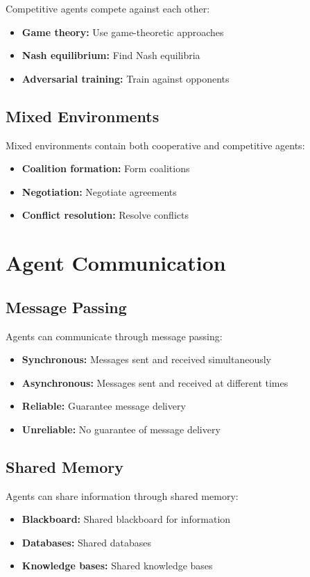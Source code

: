 Competitive agents compete against each other:
\begin{itemize}
    \item \textbf{Game theory:} Use game-theoretic approaches
    \item \textbf{Nash equilibrium:} Find Nash equilibria
    \item \textbf{Adversarial training:} Train against opponents
\end{itemize}

\subsection{Mixed Environments}

Mixed environments contain both cooperative and competitive agents:
\begin{itemize}
    \item \textbf{Coalition formation:} Form coalitions
    \item \textbf{Negotiation:} Negotiate agreements
    \item \textbf{Conflict resolution:} Resolve conflicts
\end{itemize}

\section{Agent Communication}

\subsection{Message Passing}

Agents can communicate through message passing:
\begin{itemize}
    \item \textbf{Synchronous:} Messages sent and received simultaneously
    \item \textbf{Asynchronous:} Messages sent and received at different times
    \item \textbf{Reliable:} Guarantee message delivery
    \item \textbf{Unreliable:} No guarantee of message delivery
\end{itemize}

\subsection{Shared Memory}

Agents can share information through shared memory:
\begin{itemize}
    \item \textbf{Blackboard:} Shared blackboard for information
    \item \textbf{Databases:} Shared databases
    \item \textbf{Knowledge bases:} Shared knowledge bases
\end{itemize}

